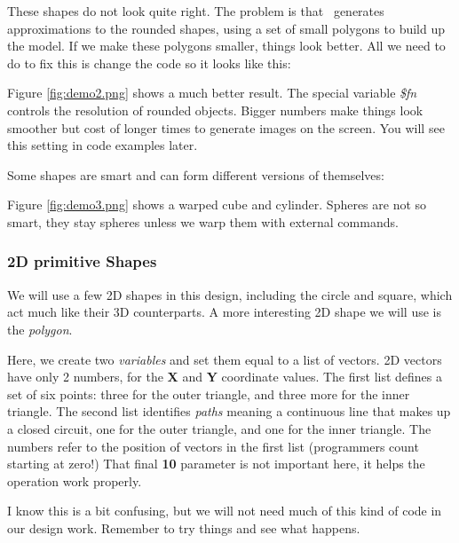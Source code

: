 These shapes do not look quite right. The problem is that \osc\  generates
approximations to the rounded shapes, using a set of small polygons to build up
the model. If we make these polygons smaller, things look better. All we need
to do to fix this is change the code so it looks like this:


Figure \ref{fig:demo2.png} shows a much better result. The special variable
{\it \$fn} controls the resolution of rounded objects. Bigger numbers make
things look smoother but cost of longer times to generate images on the screen.
You will see this setting in code examples later.


Some shapes are smart and can form different versions of themselves:


Figure \ref{fig:demo3.png} shows a warped cube and cylinder. Spheres are not so
smart, they stay spheres unless we warp them with external commands.



\subsubsection{2D primitive Shapes}

We will use a few 2D shapes in this design, including the circle and square,
which act much like their 3D counterparts. A more interesting 2D shape we will
use is the {\it polygon}.


Here, we create two {\it variables} and set them equal to a list of vectors. 2D
vectors have only 2 numbers, for the {\bf X} and {\bf Y} coordinate values. The
first list defines a set of six points: three for the outer triangle, and three
more for the inner triangle. The second list identifies {\it paths} meaning a
continuous line that makes up a closed circuit, one for the outer triangle, and
one for the inner triangle. The numbers refer to the position of vectors in the
first list (programmers count starting at zero!) That final {\bf 10} parameter
is not important here, it helps the operation work properly.

I know this is a bit confusing, but we will not need much of this kind of code
in our design work. Remember to try things and see what happens.

